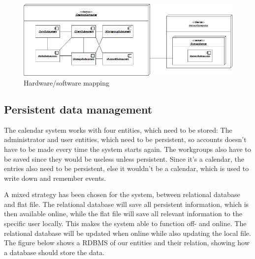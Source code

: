 \begin{figure}[h]
\centering
\includegraphics[scale = 0.7]{deployment}
\caption{Hardware/software mapping}
\end{figure}

\subsection{Persistent data management}

The calendar system works with four entities, which need to be stored: The administrator and user entities, which need to be persistent, so accounts  doesn’t have to be made every time the system starts again. The workgroups also have to be saved since they would be useless unless persistent.
	Since it’s a calendar, the entries also need to be persistent, else it wouldn’t be a calendar, which is used to write down and remember events.

A mixed strategy has been chosen for the system, between relational database and flat file. The relational database will save all persistent information, which is then available online, while the flat file will save all relevant information to the specific user locally.
	This makes the system able to function off- and online. The relational database will be updated when online while also updating the local file. 
\newline \newline \newline
The figure below shows a RDBMS of our entities and their relation, showing how a database should store the data.

